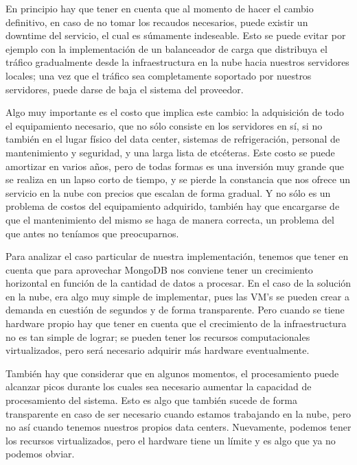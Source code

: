 \documentclass[a4paper,10pt,twoside]{article}
\begin{document}
En principio hay que tener en cuenta que al momento de hacer el cambio definitivo, en caso de no tomar los recaudos necesarios, puede existir un downtime del servicio, el cual es súmamente indeseable. Esto se puede evitar por ejemplo con la implementación de un balanceador de carga que distribuya el tráfico gradualmente desde la infraestructura en la nube hacia nuestros servidores locales; una vez que el tráfico sea completamente soportado por nuestros servidores, puede darse de baja el sistema del proveedor.

Algo muy importante es el costo que implica este cambio: la adquisición de todo el equipamiento necesario, que no sólo consiste en los servidores en sí, si no también en el lugar físico del data center, sistemas de refrigeración, personal de mantenimiento y seguridad, y una larga lista de etcéteras. Este costo se puede amortizar en varios años, pero de todas formas es una inversión muy grande que se realiza en un lapso corto de tiempo, y se pierde la constancia que nos ofrece un servicio en la nube con precios que escalan de forma gradual. Y no sólo es un problema de costos del equipamiento adquirido, también hay que encargarse de que el mantenimiento del mismo se haga de manera correcta, un problema del que antes no teníamos que preocuparnos.

Para analizar el caso particular de nuestra implementación, tenemos que tener en cuenta que para aprovechar MongoDB nos conviene tener un crecimiento horizontal en función de la cantidad de datos a procesar. En el caso de la solución en la nube, era algo muy simple de implementar, pues las VM's se pueden crear a demanda en cuestión de segundos y de forma transparente. Pero cuando se tiene hardware propio hay que tener en cuenta que el crecimiento de la infraestructura no es tan simple de lograr; se pueden tener los recursos computacionales virtualizados, pero será necesario adquirir más hardware eventualmente.

También hay que considerar que en algunos momentos, el procesamiento puede alcanzar picos durante los cuales sea necesario aumentar la capacidad de procesamiento del sistema. Esto es algo que también sucede de forma transparente en caso de ser necesario cuando estamos trabajando en la nube, pero no así cuando tenemos nuestros propios data centers. Nuevamente, podemos tener los recursos virtualizados, pero el hardware tiene un límite y es algo que ya no podemos obviar.
\end{document}
